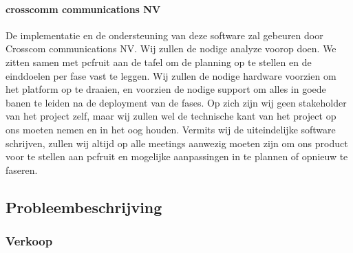 \paragraph {crosscomm communications NV} De implementatie en de ondersteuning van deze
software zal gebeuren door Crosscom communications NV. Wij zullen de nodige analyze voorop
doen. We zitten samen met pcfruit aan de tafel om de planning op te stellen en de
einddoelen per fase vast te leggen. Wij zullen de nodige hardware voorzien om het platform
op te draaien, en voorzien de nodige support om alles in goede banen te leiden na de
deployment van de fases. Op zich zijn wij geen stakeholder van het project zelf, maar wij
zullen wel de technische kant van het project op ons moeten nemen en in het oog houden.
Vermits wij de uiteindelijke software schrijven, zullen wij altijd op alle meetings
aanwezig moeten zijn om ons product voor te stellen aan pcfruit en mogelijke aanpassingen
in te plannen of opnieuw te faseren.


\subsection {Probleembeschrijving}

\subsubsection {Verkoop}

